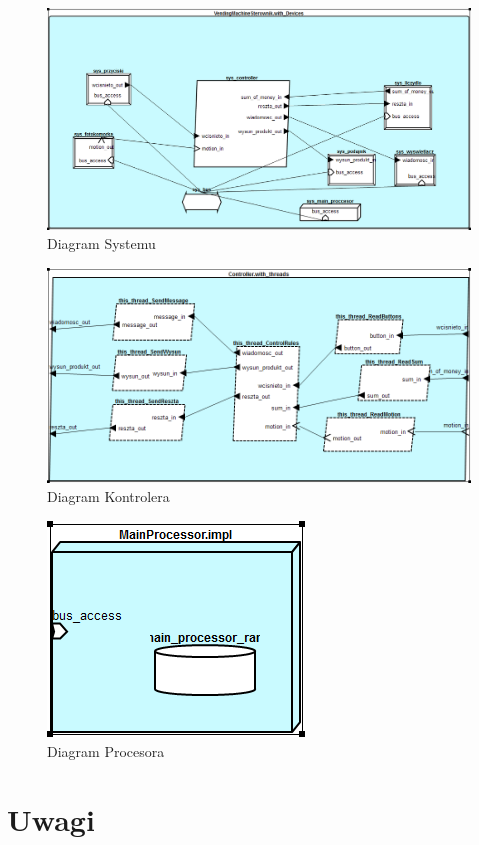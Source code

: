 \documentclass[a4paper, 11pt]{article}
\begin{document}
\begin{figure}[H]
\centerline{\includegraphics[scale=0.6]{./Diagrams/System}}
\caption{Diagram Systemu}
\end{figure}%
\begin{figure}[H]
\centerline{\includegraphics[scale=0.6]{./Diagrams/Controller}}
\caption{Diagram Kontrolera}
\end{figure}%

\begin{figure}[H]
\centerline{\includegraphics[scale=0.6]{./Diagrams/Procesor}}
\caption{Diagram Procesora}
\end{figure}%
\section{Uwagi}

%
%
\end{document}
